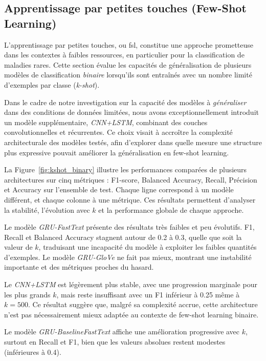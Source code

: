 \documentclass[12pt]{report}
\begin{document}
\subsection{Apprentissage par petites touches (Few-Shot Learning)}

L’apprentissage par petites touches, ou \gls{fsl}, constitue une approche prometteuse dans les contextes à faibles ressources, en particulier pour la classification de maladies rares. Cette section évalue les capacités de généralisation de plusieurs modèles de classification \textit{binaire} lorsqu’ils sont entraînés avec un nombre limité d’exemples par classe (\textit{k-shot}).

Dans le cadre de notre investigation sur la capacité des modèles à \textit{généraliser} dans des conditions de données limitées, nous avons exceptionnellement introduit un modèle supplémentaire, \textit{CNN+LSTM}, combinant des couches convolutionnelles et récurrentes. Ce choix visait à accroître la complexité architecturale des modèles testés, afin d’explorer dans quelle mesure une structure plus expressive pouvait améliorer la généralisation en few-shot learning.

La Figure~\ref{fig:kshot_binary} illustre les performances comparées de plusieurs architectures sur cinq métriques : F1-score, Balanced Accuracy, Recall, Précision et Accuracy sur l’ensemble de test. Chaque ligne correspond à un modèle différent, et chaque colonne à une métrique. Ces résultats permettent d’analyser la stabilité, l’évolution avec $k$ et la performance globale de chaque approche.

Le modèle \textit{GRU-FastText} présente des résultats très faibles et peu évolutifs. F1, Recall et Balanced Accuracy stagnent autour de 0.2 à 0.3, quelle que soit la valeur de $k$, traduisant une incapacité du modèle à exploiter les faibles quantités d’exemples. Le modèle \textit{GRU-GloVe} ne fait pas mieux, montrant une instabilité importante et des métriques proches du hasard.

Le \textit{CNN+LSTM} est légèrement plus stable, avec une progression marginale pour les plus grands $k$, mais reste insuffisant avec un F1 inférieur à 0.25 même à $k=500$. Ce résultat suggère que, malgré sa complexité accrue, cette architecture n’est pas nécessairement mieux adaptée au contexte de few-shot learning binaire.

Le modèle \textit{GRU-BaselineFastText} affiche une amélioration progressive avec $k$, surtout en Recall et F1, bien que les valeurs absolues restent modestes (inférieures à 0.4).
\end{document}
